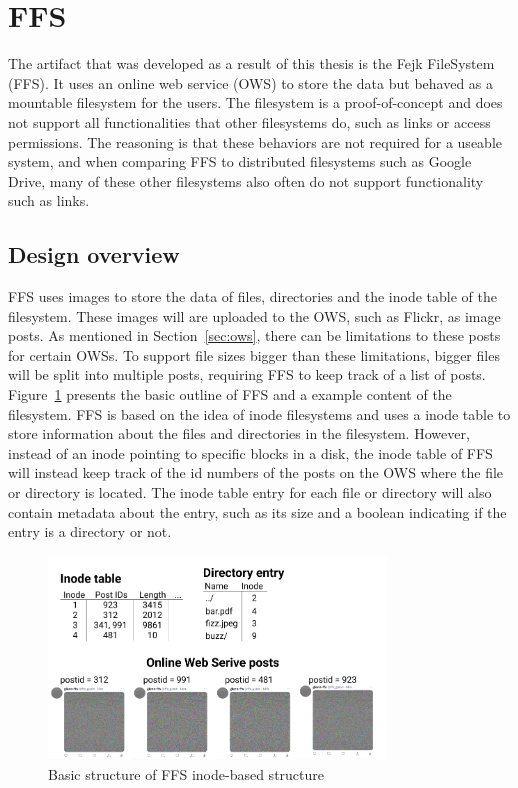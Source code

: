 \section{FFS}
The artifact that was developed as a result of this thesis is the Fejk FileSystem (FFS). It uses an online web service (\gls{OWS}) to store the data but behaved as a mountable filesystem for the users. The filesystem is a proof-of-concept and does not support all functionalities that other filesystems do, such as links or access permissions. The reasoning is that these behaviors are not required for a useable system, and when comparing FFS to distributed filesystems such as Google Drive, many of these other filesystems also often do not support functionality such as links.

\subsection{Design overview}
FFS uses images to store the data of files, directories and the inode table of the filesystem. These images will are uploaded to the OWS, such as Flickr, as image posts. As mentioned in Section~\ref{sec:ows}, there can be limitations to these posts for certain OWSs. To support file sizes bigger than these limitations, bigger files will be split into multiple posts, requiring FFS to keep track of a list of posts. Figure~\ref{fig:ffs_inode_diag} presents the basic outline of FFS and a example content of the filesystem. FFS is based on the idea of inode filesystems and uses a inode table to store information about the files and directories in the filesystem. However, instead of an inode pointing to specific blocks in a disk, the inode table of FFS will instead keep track of the id numbers of the posts on the OWS where the file or directory is located. The inode table entry for each file or directory will also contain metadata about the entry, such as its size and a boolean indicating if the entry is a directory or not.

\begin{figure}[!ht]
	\begin{center}
	  \includegraphics[width=0.8\textwidth]{figures/ffs_inode_diagram.png}
	\end{center}
	\caption{Basic structure of FFS inode-based structure}
	\label{fig:ffs_inode_diag}
\end{figure}

